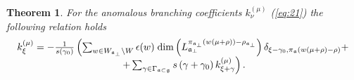 \documentclass[12pt]{iopart}
\newtheorem{theorem}{Theorem}
\theoremstyle{definition}
\newcommand{\af}{\mathfrak{a}}
\newcommand{\afb}{\mathfrak{a}_{\bot}}
\begin{document}
\begin{theorem}
  For the anomalous branching coefficients $k^{(\mu)}_{\nu}$ (\ref{eq:21})
  the following relation holds
  \begin{equation}
    \label{recurrent-relation}
    \begin{array}{c}
      k_{\xi }^{\left( \mu \right) }=-\frac{1}{s\left( \gamma _{0}\right) }\left(
        \sum_{w\in W_{\afb}\backslash W} \epsilon(w)\;
        {\rm dim}\left(L^{\pi_{\afb}(w(\mu+\rho))-\rho_{\afb}}_{\afb}\right)
        \delta_{\xi-\gamma_0,\pi_{\af}(w(\mu+\rho)-\rho)}+ \right.\\
      \left.
        +\sum_{\gamma \in
          \Gamma _{\af\subset \frak{g}}}s\left( \gamma +\gamma _{0}\right) k_{\xi
          +\gamma }^{\left( \mu \right) }\right).
    \end{array}
  \end{equation}
\end{theorem}
\end{document}
